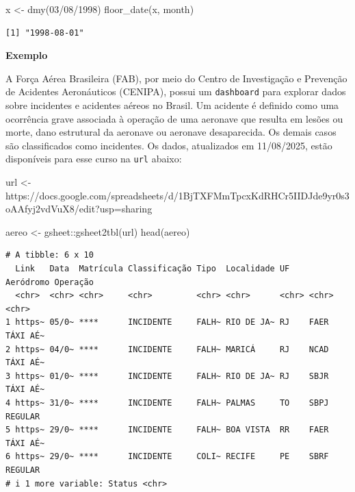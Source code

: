 \documentclass[
  letterpaper,
  DIV=11,
  numbers=noendperiod]{scrartcl}
\newenvironment{Shaded}{\begin{snugshade}}{\end{snugshade}}
\newcommand{\FunctionTok}[1]{\textcolor[rgb]{0.28,0.35,0.67}{#1}}
\newcommand{\NormalTok}[1]{\textcolor[rgb]{0.00,0.23,0.31}{#1}}
\newcommand{\OtherTok}[1]{\textcolor[rgb]{0.00,0.23,0.31}{#1}}
\newcommand{\SpecialCharTok}[1]{\textcolor[rgb]{0.37,0.37,0.37}{#1}}
\newcommand{\StringTok}[1]{\textcolor[rgb]{0.13,0.47,0.30}{#1}}
\theoremstyle{definition}
\theoremstyle{definition}
\theoremstyle{plain}
\theoremstyle{plain}
\theoremstyle{remark}
\begin{document}
\begin{Shaded}
\begin{Highlighting}[]
\NormalTok{x }\OtherTok{\textless{}{-}} \FunctionTok{dmy}\NormalTok{(}\StringTok{\textquotesingle{}03/08/1998\textquotesingle{}}\NormalTok{)}
\FunctionTok{floor\_date}\NormalTok{(x, }\StringTok{\textquotesingle{}month\textquotesingle{}}\NormalTok{)}
\end{Highlighting}
\end{Shaded}

\begin{verbatim}
[1] "1998-08-01"
\end{verbatim}

\textbf{Exemplo}

A Força Aérea Brasileira (FAB), por meio do Centro de Investigação e
Prevenção de Acidentes Aeronáuticos (CENIPA), possui um
\texttt{dashboard} para explorar dados sobre incidentes e acidentes
aéreos no Brasil. Um acidente é definido como uma ocorrência grave
associada à operação de uma aeronave que resulta em lesões ou morte,
dano estrutural da aeronave ou aeronave desaparecida. Os demais casos
são classificados como incidentes. Os dados, atualizados em 11/08/2025,
estão disponíveis para esse curso na \texttt{url} abaixo:

\begin{Shaded}
\begin{Highlighting}[]
\NormalTok{url }\OtherTok{\textless{}{-}} \StringTok{\textquotesingle{}https://docs.google.com/spreadsheets/d/1BjTXFMmTpcxKdRHCr5IIDJde9yr0s3oAAfyj2vdVuX8/edit?usp=sharing\textquotesingle{}}

\NormalTok{aereo }\OtherTok{\textless{}{-}}\NormalTok{  gsheet}\SpecialCharTok{::}\FunctionTok{gsheet2tbl}\NormalTok{(url)}
\FunctionTok{head}\NormalTok{(aereo)}
\end{Highlighting}
\end{Shaded}

\begin{verbatim}
# A tibble: 6 x 10
  Link   Data  Matrícula Classificação Tipo  Localidade UF    Aeródromo Operação
  <chr>  <chr> <chr>     <chr>         <chr> <chr>      <chr> <chr>     <chr>   
1 https~ 05/0~ ****      INCIDENTE     FALH~ RIO DE JA~ RJ    FAER      TÁXI AÉ~
2 https~ 04/0~ ****      INCIDENTE     FALH~ MARICÁ     RJ    NCAD      TÁXI AÉ~
3 https~ 01/0~ ****      INCIDENTE     FALH~ RIO DE JA~ RJ    SBJR      TÁXI AÉ~
4 https~ 31/0~ ****      INCIDENTE     FALH~ PALMAS     TO    SBPJ      REGULAR 
5 https~ 29/0~ ****      INCIDENTE     FALH~ BOA VISTA  RR    FAER      TÁXI AÉ~
6 https~ 29/0~ ****      INCIDENTE     COLI~ RECIFE     PE    SBRF      REGULAR 
# i 1 more variable: Status <chr>
\end{verbatim}
\end{document}
